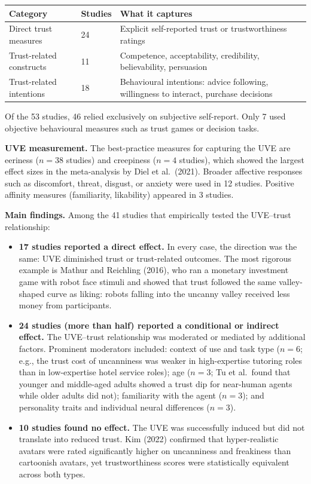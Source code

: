 \documentclass[11pt, a4paper]{article}
\begin{document}
\begin{center}
\begin{tabular}{@{}p{4.5cm}p{1.5cm}p{7.5cm}@{}}
\toprule
\textbf{Category} & \textbf{Studies} & \textbf{What it captures} \\
\midrule
Direct trust measures & 24 & Explicit self-reported trust or trustworthiness ratings \\
Trust-related constructs & 11 & Competence, acceptability, credibility, believability, persuasion \\
Trust-related intentions & 18 & Behavioural intentions: advice following, willingness to interact, purchase decisions \\
\bottomrule
\end{tabular}
\end{center}

Of the 53 studies, 46 relied exclusively on subjective self-report. Only 7 used objective behavioural measures such as trust games or decision tasks.

\medskip
\textbf{UVE measurement.} The best-practice measures for capturing the UVE are eeriness ($n = 38$ studies) and creepiness ($n = 4$ studies), which showed the largest effect sizes in the meta-analysis by Diel et al.\ (2021). Broader affective responses such as discomfort, threat, disgust, or anxiety were used in 12 studies. Positive affinity measures (familiarity, likability) appeared in 3 studies.

\medskip
\textbf{Main findings.} Among the 41 studies that empirically tested the UVE--trust relationship:

\begin{itemize}
  \item \textbf{17 studies reported a direct effect.} In every case, the direction was the same: UVE diminished trust or trust-related outcomes. The most rigorous example is Mathur and Reichling (2016), who ran a monetary investment game with robot face stimuli and showed that trust followed the same valley-shaped curve as liking: robots falling into the uncanny valley received less money from participants.

  \item \textbf{24 studies (more than half) reported a conditional or indirect effect.} The UVE--trust relationship was moderated or mediated by additional factors. Prominent moderators included: context of use and task type ($n = 6$; e.g., the trust cost of uncanniness was weaker in high-expertise tutoring roles than in low-expertise hotel service roles); age ($n = 3$; Tu et al.\ found that younger and middle-aged adults showed a trust dip for near-human agents while older adults did not); familiarity with the agent ($n = 3$); and personality traits and individual neural differences ($n = 3$).

  \item \textbf{10 studies found no effect.} The UVE was successfully induced but did not translate into reduced trust. Kim (2022) confirmed that hyper-realistic avatars were rated significantly higher on uncanniness and freakiness than cartoonish avatars, yet trustworthiness scores were statistically equivalent across both types.
\end{itemize}
\end{document}
